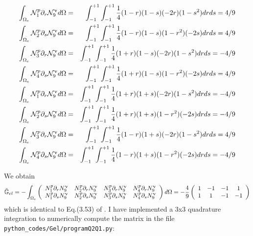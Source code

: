 \begin{tiny}
\begin{eqnarray}
\int_{\Omega_e}  {\mathcal{N}}_1^p \partial_r {\mathcal{N}}_9^\upnu d\Omega &=&  
\int_{-1}^{+1}\int_{-1}^{+1}\frac{1}{4}(1-r)(1-s)    (-2r)(1-s^2)  drds = 4/9 \nonumber\\
\int_{\Omega_e}  {\mathcal{N}}_2^p \partial_s {\mathcal{N}}_9^\upnu d\Omega &=&  
\int_{-1}^{+1}\int_{-1}^{+1}\frac{1}{4}(1-r)(1-s)    (1-r^2)(-2s)  drds = 4/9 \nonumber\\
\int_{\Omega_e}  {\mathcal{N}}_3^p \partial_r {\mathcal{N}}_9^\upnu d\Omega &=&  
\int_{-1}^{+1}\int_{-1}^{+1}\frac{1}{4}(1+r)(1-s)    (-2r)(1-s^2)  drds = -4/9 \nonumber\\
\int_{\Omega_e}  {\mathcal{N}}_4^p \partial_s {\mathcal{N}}_9^\upnu d\Omega &=&  
\int_{-1}^{+1}\int_{-1}^{+1}\frac{1}{4}(1+r)(1-s)    (1-r^2)(-2s)  drds = 4/9 \nonumber\\
\int_{\Omega_e}  {\mathcal{N}}_1^p \partial_r {\mathcal{N}}_9^\upnu d\Omega &=&  
\int_{-1}^{+1}\int_{-1}^{+1}\frac{1}{4}(1+r)(1+s)    (-2r)(1-s^2)  drds = -4/9 \nonumber\\
\int_{\Omega_e}  {\mathcal{N}}_2^p \partial_s {\mathcal{N}}_9^\upnu d\Omega &=&  
\int_{-1}^{+1}\int_{-1}^{+1}\frac{1}{4}(1+r)(1+s)    (1-r^2)(-2s)  drds = -4/9  \nonumber\\
\int_{\Omega_e}  {\mathcal{N}}_3^p \partial_r {\mathcal{N}}_9^\upnu d\Omega &=&  
\int_{-1}^{+1}\int_{-1}^{+1}\frac{1}{4}(1-r)(1+s)    (-2r)(1-s^2)  drds = 4/9 \nonumber\\
\int_{\Omega_e}  {\mathcal{N}}_4^p \partial_s {\mathcal{N}}_9^\upnu d\Omega &=&  
\int_{-1}^{+1}\int_{-1}^{+1}\frac{1}{4}(1-r)(1+s)    (1-r^2)(-2s)  drds = -4/9 \nonumber
\end{eqnarray}
\end{tiny}

We obtain
\[
\tilde{{\mathbb{G}}}_{el}=
-\int_{\Omega_e}
\left(
\begin{array}{cccc}
N_1^p\partial_r N_9^\upnu & N_2^p\partial_r N_9^\upnu & N_3^p\partial_r N_9^\upnu & N_4^p\partial_r N_9^\upnu \\
N_1^p\partial_s N_9^\upnu & N_2^p\partial_s N_9^\upnu & N_3^p\partial_s N_9^\upnu & N_4^p\partial_s N_9^\upnu 
\end{array}
\right)
d\Omega 
=
- \frac{4}{9}
\left(
\begin{array}{cccc}
1 &-1 &-1 &1 \\
1 &1 &-1 &-1 
\end{array}
\right)
\]
which is identical to Eq.(3.53) of \textcite{elsw}.
I have implemented a 3x3 quadrature integration to numerically compute the matrix
in the file {\tt python\_codes/Gel/programQ2Q1.py}:

